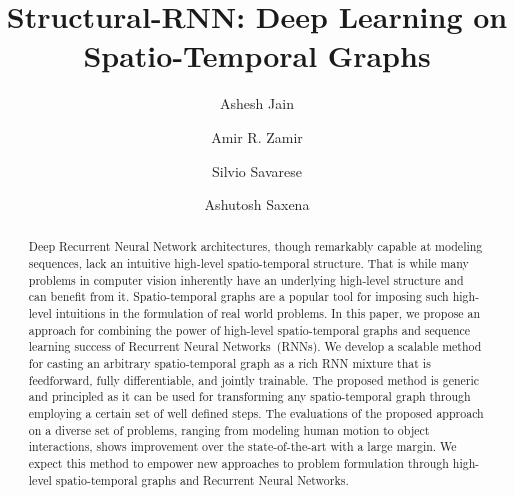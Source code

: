 \documentclass[10pt,twocolumn,letterpaper]{article}
\begin{document}
\title{ Structural-RNN: Deep Learning on Spatio-Temporal Graphs}
\author[1,2]{Ashesh Jain}
\author[2]{Amir R. Zamir}
\author[2]{Silvio Savarese}
\author[3]{Ashutosh Saxena}

\iffalse
\title{ Structural-RNN: Deep Learning on Spatio-Temporal Graphs}
\author{First Author\\
Institution1\\
Institution1 address\\
{\tt\small firstauthor@i1.org}
\and
Second Author\\
Institution2\\
First line of institution2 address\\
{\tt\small secondauthor@i2.org}
}
\fi

\maketitle

\begin{abstract}
Deep Recurrent Neural Network architectures, though remarkably capable at modeling sequences, lack an intuitive high-level spatio-temporal structure. That is while many problems in computer vision inherently have an underlying high-level structure and can benefit from it. Spatio-temporal graphs are a popular  tool for imposing such high-level intuitions in the formulation of real world problems. In this paper, we propose an approach for combining the power of high-level spatio-temporal graphs and sequence learning success of Recurrent Neural Networks~(RNNs). We develop a scalable method for casting an arbitrary spatio-temporal graph as a rich RNN mixture that is feedforward, fully differentiable, and jointly trainable. The proposed method is generic and principled as it can be used for transforming any spatio-temporal graph through employing a certain set of well defined steps. The evaluations of the proposed approach on a diverse set of problems, ranging from modeling human motion to object interactions, shows improvement over the state-of-the-art with a large margin. We expect this method to empower  new approaches to problem formulation through high-level spatio-temporal graphs and Recurrent Neural Networks.
\end{abstract}%
\end{document}
